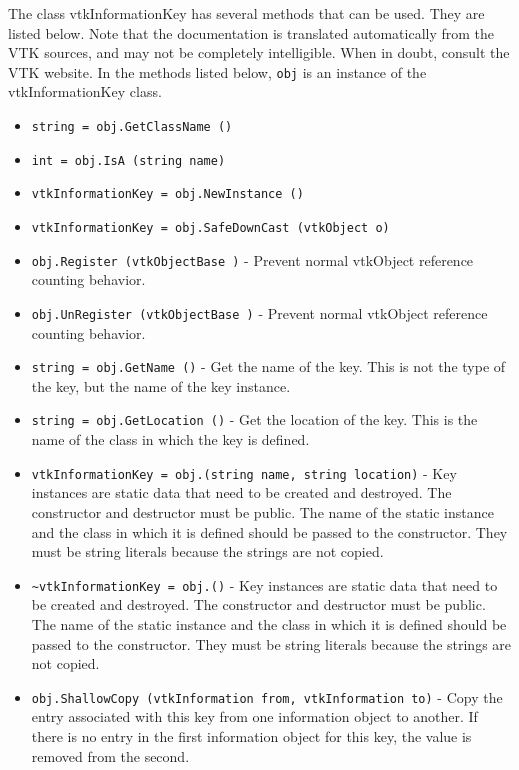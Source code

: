 The class vtkInformationKey has several methods that can be used.
  They are listed below.
Note that the documentation is translated automatically from the VTK sources,
and may not be completely intelligible.  When in doubt, consult the VTK website.
In the methods listed below, \verb|obj| is an instance of the vtkInformationKey class.
\begin{itemize}
\item  \verb|string = obj.GetClassName ()|

\item  \verb|int = obj.IsA (string name)|

\item  \verb|vtkInformationKey = obj.NewInstance ()|

\item  \verb|vtkInformationKey = obj.SafeDownCast (vtkObject o)|

\item  \verb|obj.Register (vtkObjectBase )| -  Prevent normal vtkObject reference counting behavior.

\item  \verb|obj.UnRegister (vtkObjectBase )| -  Prevent normal vtkObject reference counting behavior.

\item  \verb|string = obj.GetName ()| -  Get the name of the key.  This is not the type of the key, but
 the name of the key instance.

\item  \verb|string = obj.GetLocation ()| -  Get the location of the key.  This is the name of the class in
 which the key is defined.

\item  \verb|vtkInformationKey = obj.(string name, string location)| -  Key instances are static data that need to be created and
 destroyed.  The constructor and destructor must be public.  The
 name of the static instance and the class in which it is defined
 should be passed to the constructor.  They must be string
 literals because the strings are not copied.

\item  \verb|~vtkInformationKey = obj.()| -  Key instances are static data that need to be created and
 destroyed.  The constructor and destructor must be public.  The
 name of the static instance and the class in which it is defined
 should be passed to the constructor.  They must be string
 literals because the strings are not copied.

\item  \verb|obj.ShallowCopy (vtkInformation from, vtkInformation to)| -  Copy the entry associated with this key from one information
 object to another.  If there is no entry in the first information
 object for this key, the value is removed from the second.


\end{itemize}
